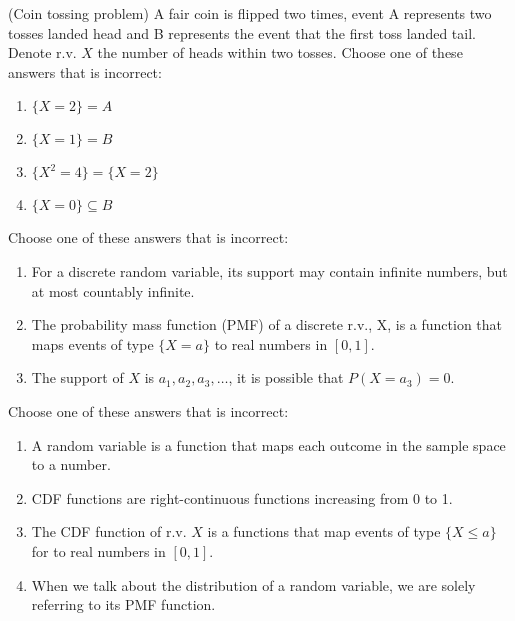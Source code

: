 \documentclass[poll_tutorial_format]{subfiles}
\begin{document}
	
	
	\begin{exercise}
		(Coin tossing problem) A fair coin is flipped two times, event A represents two tosses landed head and B represents the event that the first toss landed tail. Denote r.v. $X$ the number of heads within two tosses.
		Choose one of these answers that is incorrect: %
		\begin{enumerate}
			\item $\{X=2\}=A$
			\item $ \{X=1\}=B$
			\item $\{X^2 =4\} =\{X=2\} $
			\item $ \{X=0\} \subseteq B$
		\end{enumerate}
	\end{exercise}
	
	
	
	\begin{exercise}
			Choose one of these answers that is incorrect:%
		\begin{enumerate}
			\item For a discrete random variable, its support may contain infinite numbers, but at most countably infinite.
			\item The probability mass function
			(PMF) of a discrete r.v., X, is a function that maps events of type $\{X=a\}$  to real numbers in $[0,1]$.
			\item The support of $X$ is $a_1, a_2, a_3, \dots$, it is possible that $P(X=a_{3})=0$.
		\end{enumerate}
	\end{exercise}
	
	
		\begin{exercise}
		Choose one of these answers that is incorrect:%
		\begin{enumerate}
			\item A random variable is a function that maps each outcome in the sample space to a number.  
			\item CDF functions are right-continuous functions increasing from 0 to 1.
			\item The CDF function of r.v. $X$ is a functions that map events of type $\{X\leq a\}$  for  to real numbers in $[0,1]$.
			\item When we talk about the distribution of a random variable, we are solely referring to its PMF function.
		\end{enumerate}
	\end{exercise}
	
\end{document}
